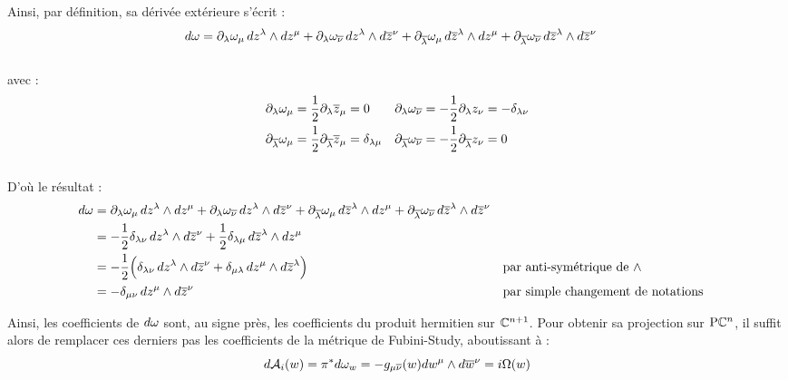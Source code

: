 Ainsi, par définition, sa dérivée extérieure s'écrit :
\begin{align*}
	d\omega &= \partial_\lambda\omega_\mu\, dz^\lambda \wedge dz^\mu 
	+ \partial_\lambda\omega_{\overline{\nu}}\, dz^\lambda \wedge d\overline{z}^\nu
	+ \partial_{\overline{\lambda}}\omega_\mu\, d\overline{z}^\lambda \wedge dz^\mu 
	+ \partial_{\overline{\lambda}}\omega_{\overline{\nu}}\, d\overline{z}^\lambda \wedge d\overline{z}^\nu
\end{align*}
\\
avec :
\begin{align*}
	\partial_\lambda \omega_\mu &= \frac{1}{2}\partial_\lambda \overline{z}_\mu = 0   &
	\partial_\lambda\omega_{\overline{\nu}} &= -\frac{1}{2}\partial_\lambda z_\nu = -\delta_{\lambda \nu} \\
	\partial_{\overline{\lambda}}\omega_\mu &= \frac{1}{2}\partial_{\overline{\lambda}} \overline{z}_\mu = \delta_{\lambda \mu}  &
	\partial_{\overline{\lambda}} \omega_{\overline{\nu}} &= -\frac{1}{2}\partial_{\overline{\lambda}} z_\nu = 0
\end{align*}
\\
D'où le résultat :
\begin{align*}
	d\omega &= \partial_\lambda\omega_\mu\, dz^\lambda \wedge dz^\mu 
	+ \partial_\lambda\omega_{\overline{\nu}}\, dz^\lambda \wedge d\overline{z}^\nu
	+ \partial_{\overline{\lambda}}\omega_\mu\, d\overline{z}^\lambda \wedge dz^\mu 
	+ \partial_{\overline{\lambda}}\omega_{\overline{\nu}}\, d\overline{z}^\lambda \wedge d\overline{z}^\nu \\
	&= -\frac{1}{2}\delta_{\lambda \nu}\, dz^\lambda \wedge d\overline{z}^\nu
	+ \frac{1}{2}\delta_{\lambda \mu}\, d\overline{z}^\lambda \wedge dz^\mu \\
	&= -\frac{1}{2}\Big( \delta_{\lambda \nu}\, dz^\lambda \wedge d\overline{z}^\nu + \delta_{\mu \lambda}\, dz^\mu \wedge d\overline{z}^\lambda \Big)  &  &\text{par anti-symétrique de $\wedge$}\\
	&= -\delta_{\mu \nu}\, dz^\mu \wedge d\overline{z}^\nu  &  &\text{par simple changement de notations}
\end{align*}
\skipl

Ainsi, les coefficients de $d\omega$ sont, au signe près, les coefficients du produit hermitien sur $\mathbb{C}^{n+1}$. Pour obtenir sa projection sur $\text{\normalfont P}\mathbb{C}^{n}$, il suffit alors de remplacer ces derniers pas les coefficients de la métrique de Fubini-Study, aboutissant à :
\[d\mathcal{A}_i(w) = \pi^*d\omega_w = -g_{\mu \overline{\nu}}(w) dw^\mu \wedge d\overline{w}^\nu = i\Omega(w)\]
\skipl




